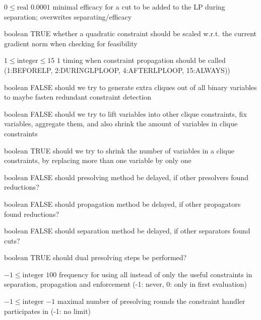 %
{$0\leq\textrm{real}$}%
{$0.0001$}%
{minimal efficacy for a cut to be added to the LP during separation; overwrites separating/efficacy}%
{}

%
{boolean}%
{TRUE}%
{whether a quadratic constraint should be scaled w.r.t. the current gradient norm when checking for feasibility}%
{}

%
{$1\leq\textrm{integer}\leq15$}%
{$1$}%
{timing when constraint propagation should be called (1:BEFORELP, 2:DURINGLPLOOP, 4:AFTERLPLOOP, 15:ALWAYS))}%
{}

%
{boolean}%
{FALSE}%
{should we try to generate extra cliques out of all binary variables to maybe fasten redundant constraint detection}%
{}

%
{boolean}%
{FALSE}%
{ should we try to lift variables into other clique constraints, fix variables, aggregate them, and also shrink the amount of variables in clique constraints}%
{}

%
{boolean}%
{TRUE}%
{should we try to shrink the number of variables in a clique constraints, by replacing more than one variable by only one}%
{}

%
{boolean}%
{FALSE}%
{should presolving method be delayed, if other presolvers found reductions?}%
{}

%
{boolean}%
{FALSE}%
{should propagation method be delayed, if other propagators found reductions?}%
{}

%
{boolean}%
{FALSE}%
{should separation method be delayed, if other separators found cuts?}%
{}

%
{boolean}%
{TRUE}%
{should dual presolving steps be performed?}%
{}

%
{$-1\leq\textrm{integer}$}%
{$100$}%
{frequency for using all instead of only the useful constraints in separation, propagation and enforcement (-1: never, 0: only in first evaluation)}%
{}

%
{$-1\leq\textrm{integer}$}%
{$-1$}%
{maximal number of presolving rounds the constraint handler participates in (-1: no limit)}%
{}

